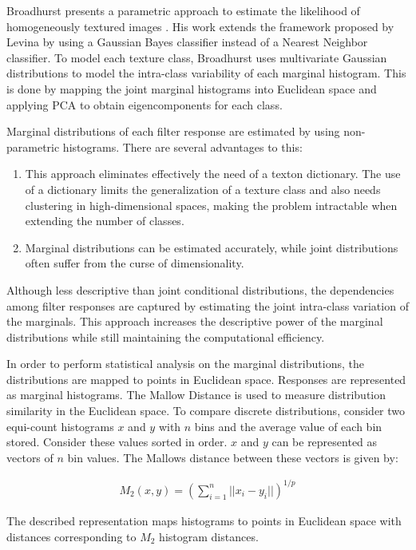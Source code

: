 Broadhurst presents a parametric approach to estimate the likelihood of homogeneously textured images \cite{Broadhurst}. His work extends the framework proposed by Levina \cite{Levina} by using a Gaussian Bayes classifier instead of a Nearest Neighbor classifier. To model each texture class, Broadhurst uses multivariate Gaussian distributions to model the intra-class variability of each marginal histogram. This is done by mapping the joint marginal histograms into Euclidean space and applying PCA to obtain eigencomponents for each class.

Marginal distributions of each filter response are estimated by using non-parametric histograms. There are several advantages to this:

\begin{enumerate}
	\item This approach eliminates effectively the need of a texton dictionary. The use of a dictionary limits the generalization of a texture class and also needs clustering in high-dimensional spaces, making the problem intractable when extending the number of classes.
	\item Marginal distributions can be estimated accurately, while joint distributions often suffer from the curse of dimensionality.
\end{enumerate}

\noindent Although less descriptive than joint conditional distributions, the dependencies among filter responses are captured by estimating the joint intra-class variation of the marginals. This approach increases the descriptive power of the marginal distributions while still maintaining the computational efficiency. 

In order to perform statistical analysis on the marginal distributions, the distributions are mapped to points in Euclidean space. Responses are represented as marginal histograms. The Mallow Distance is used to measure distribution similarity in the Euclidean space. To compare discrete distributions, consider two equi-count histograms $x$ and $y$ with $n$ bins and the average value of each bin stored. Consider these values sorted in order. $x$ and $y$ can be represented as vectors of $n$ bin values. The Mallows distance between these vectors is given by:

	\begin{eqnarray*}
		M_2(x, y) = (\sum^n_{i=1} ||x_i - y_i||)^{1/p}
	\end{eqnarray*}

The described representation maps histograms to points in Euclidean space with distances corresponding to $M_2$ histogram distances.

